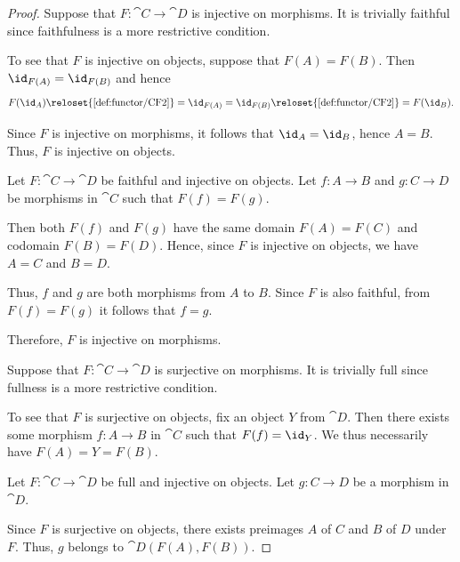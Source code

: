 \begin{proof}
  \SufficiencySubProof* Suppose that \( F: \cat{C} \to \cat{D} \) is injective on morphisms. It is trivially faithful since faithfulness is a more restrictive condition.

  To see that \( F \) is injective on objects, suppose that \( F(A) = F(B) \). Then \( \id_{F(A)} = \id_{F(B)} \) and hence
  \begin{equation*}
    F(\id_A)
    \reloset {\ref{def:functor/CF2}} =
    \id_{F(A)}
    =
    \id_{F(B)}
    \reloset {\ref{def:functor/CF2}} =
    F(\id_B).
  \end{equation*}

  Since \( F \) is injective on morphisms, it follows that \( \id_A = \id_B \), hence \( A = B \). Thus, \( F \) is injective on objects.

  \NecessitySubProof* Let \( F: \cat{C} \to \cat{D} \) be faithful and injective on objects. Let \( f: A \to B \) and \( g: C \to D \) be morphisms in \( \cat{C} \) such that \( F(f) = F(g) \).

  Then both \( F(f) \) and \( F(g) \) have the same domain \( F(A) = F(C) \) and codomain \( F(B) = F(D) \). Hence, since \( F \) is injective on objects, we have \( A = C \) and \( B = D \).

  Thus, \( f \) and \( g \) are both morphisms from \( A \) to \( B \). Since \( F \) is also faithful, from \( F(f) = F(g) \) it follows that \( f = g \).

  Therefore, \( F \) is injective on morphisms.

  \SufficiencySubProof* Suppose that \( F: \cat{C} \to \cat{D} \) is surjective on morphisms. It is trivially full since fullness is a more restrictive condition.

  To see that \( F \) is surjective on objects, fix an object \( Y \) from \( \cat{D} \). Then there exists some morphism \( f: A \to B \) in \( \cat{C} \) such that \( F(f) = \id_Y \). We thus necessarily have \( F(A) = Y = F(B) \).

  \NecessitySubProof* Let \( F: \cat{C} \to \cat{D} \) be full and injective on objects. Let \( g: C \to D \) be a morphism in \( \cat{D} \).

  Since \( F \) is surjective on objects, there exists preimages \( A \) of \( C \) and \( B \) of \( D \) under \( F \). Thus, \( g \) belongs to \( \cat{D}(F(A), F(B)) \).


\end{proof}
